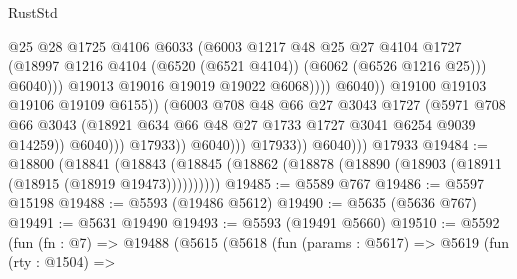 \begin{lexlean}{RustStd}
\begin{coremodule}
                                                @25
                                                @28
                                                @1725
                                                @4106
                                                @6033
                                                (@6003
                                                  @1217
                                                  @48
                                                  @25
                                                  @27
                                                  @4104
                                                  @1727
                                                  (@18997
                                                    @1216
                                                    @4104
                                                    (@6520 (@6521 @4104))
                                                    (@6062 (@6526 @1216 @25)))
                                                  @6040)))
                                            @19013
                                            @19016
                                            @19019
                                            @19022
                                            @6068))))
                                    @6040))
                                @19100
                                @19103
                                @19106
                                @19109
                                @6155))
                            (@6003
                              @708
                              @48
                              @66
                              @27
                              @3043
                              @1727
                              (@5971
                                @708
                                @66
                                @3043
                                (@18921 @634 @66 @48 @27 @1733 @1727 @3041 @6254 @9039 @14259))
                              @6040)))
                        @17933))
                    @6040)))
              @17933))
          @6040)))
    @17933
@19484 := @18800
    (@18841 (@18843 (@18845 (@18862 (@18878 (@18890 (@18903 (@18911 (@18915 (@18919 @19473))))))))))
@19485 := @5589 @767
@19486 := @5597 @15198
@19488 := @5593 (@19486 @5612)
@19490 := @5635 (@5636 @767)
@19491 := @5631 @19490
@19493 := @5593 (@19491 @5660)
@19510 := @5592
    (fun (fn : @7) =>
    @19488
      (@5615
        (@5618
          (fun (params : @5617) =>
          @5619
            (fun (rty : @1504) =>

\end{coremodule}
\end{lexlean}
